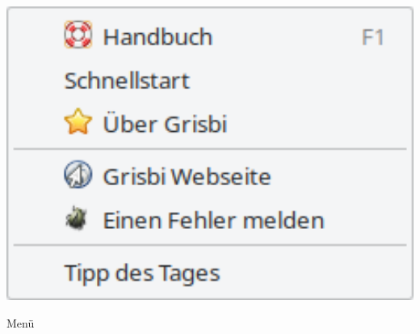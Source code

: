 \begin{minipage}{.3\linewidth}
\centering						%
\includegraphics[width=1\textwidth]{image/screenshot/home_menubar_help}
\vspace{-15pt}					%
\captionsetup{
type=figure,%
name=Abb.,%
labelsep=newline}			%
\caption{Menü }	%
\label{home_menubar_help}
\end{minipage} 
